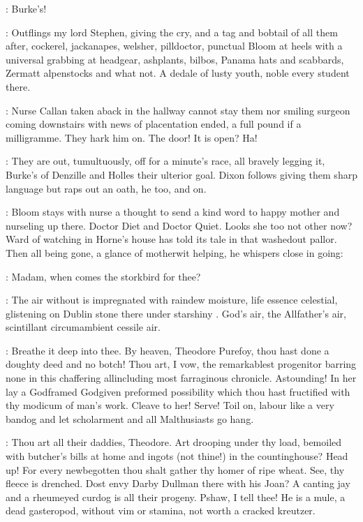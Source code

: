 \stephen:
Burke's!

:
Outflings my lord Stephen,
giving the cry,
and a tag and bobtail
of all them after,
cockerel,
jackanapes,
welsher,
pilldoctor,
punctual
Bloom at heels with a universal grabbing at headgear,
ashplants,
bilbos,
Panama hats and scabbards,
Zermatt alpenstocks and what not.
A dedale of
lusty youth,
noble every student there.

:
Nurse Callan taken aback in the hallway cannot stay them nor smiling
surgeon coming downstairs with news of placentation ended,
a full pound if
a milligramme.
They hark him on.
The door!
It is open?
Ha!

:
They are out,
tumultuously,
off for a minute's race,
all bravely
legging it,
Burke's of Denzille and Holles their ulterior goal.
Dixon follows giving them sharp language but raps out an oath,
he too,
and on.

:
Bloom stays with nurse a thought to send a kind
word to happy mother and nurseling up there.
Doctor Diet and Doctor
Quiet.
Looks she too not other now?
Ward of watching in Horne's house has
told its tale in that washedout pallor.
Then all being gone,
a glance of
motherwit helping,
he whispers close in going:

\Bloom:
Madam,
when comes the storkbird for thee?

:
The air without is impregnated with raindew moisture,
life essence
celestial,
glistening on Dublin stone there under starshiny .
God's air,
the Allfather's air,
scintillant circumambient cessile air.

:
Breathe it deep into thee.
By heaven,
Theodore Purefoy,
thou hast done a doughty deed and no botch!
Thou art,
I vow,
the remarkablest progenitor barring none in this chaffering allincluding most farraginous chronicle.
Astounding!
In her lay a Godframed Godgiven preformed
possibility which thou hast fructified with thy modicum of man's work.
Cleave to her!
Serve!
Toil on,
labour like a very bandog and let
scholarment and all Malthusiasts go hang.

:
Thou art all their daddies,
Theodore.
Art drooping
under thy load,
bemoiled with butcher's bills at home and ingots
(not thine!)
in the countinghouse?
Head up!
For every newbegotten thou shalt
gather thy homer of ripe wheat.
See,
thy fleece is drenched.
Dost envy
Darby Dullman there with his Joan?
A canting jay and a rheumeyed curdog
is all their progeny.
Pshaw,
I tell thee!
He is a mule,
a dead
gasteropod,
without vim or stamina,
not worth a cracked kreutzer.

